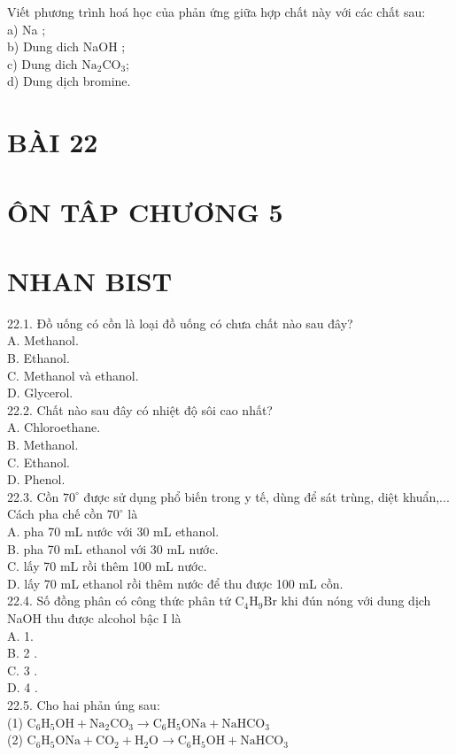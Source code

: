 \documentclass[10pt]{article}
\begin{document}
Viết phương trình hoá học của phản ứng giữa hợp chất này với các chất sau:\\
a) Na ;\\
b) Dung dich NaOH ;\\
c) Dung dich $\mathrm{Na}_{2} \mathrm{CO}_{3}$;\\
d) Dung dịch bromine.

\section*{BÀI 22}
\section*{ÔN TÂP CHƯƠNG 5}
\section*{NHAN BIST}
22.1. Đồ uống có cồn là loại đồ uống có chưa chất nào sau đây?\\
A. Methanol.\\
B. Ethanol.\\
C. Methanol và ethanol.\\
D. Glycerol.\\
22.2. Chất nào sau đây có nhiệt độ sôi cao nhất?\\
A. Chloroethane.\\
B. Methanol.\\
C. Ethanol.\\
D. Phenol.\\
22.3. Cồn $70^{\circ}$ được sử dụng phổ biến trong y tế, dùng để sát trùng, diệt khuẩn,... Cách pha chế cồn $70^{\circ}$ là\\
A. pha 70 mL nước với 30 mL ethanol.\\
B. pha 70 mL ethanol với 30 mL nước.\\
C. lấy 70 mL rồi thêm 100 mL nước.\\
D. lấy 70 mL ethanol rồi thêm nước để thu được 100 mL cồn.\\
22.4. Số đồng phân có công thức phân tứ $\mathrm{C}_{4} \mathrm{H}_{9} \mathrm{Br}$ khi đún nóng với dung dịch NaOH thu được alcohol bậc I là\\
A. 1.\\
B. 2 .\\
C. 3 .\\
D. 4 .\\
22.5. Cho hai phản úng sau:\\
(1) $\mathrm{C}_{6} \mathrm{H}_{5} \mathrm{OH}+\mathrm{Na}_{2} \mathrm{CO}_{3} \longrightarrow \mathrm{C}_{6} \mathrm{H}_{5} \mathrm{ONa}+\mathrm{NaHCO}_{3}$\\
(2) $\mathrm{C}_{6} \mathrm{H}_{5} \mathrm{ONa}+\mathrm{CO}_{2}+\mathrm{H}_{2} \mathrm{O} \longrightarrow \mathrm{C}_{6} \mathrm{H}_{5} \mathrm{OH}+\mathrm{NaHCO}_{3}$
\end{document}
